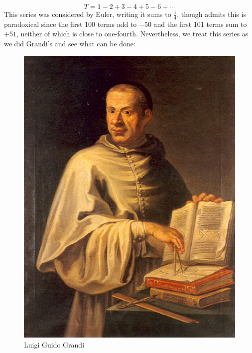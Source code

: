 \begin{example}
\begin{minipage}[c]{0.58\textwidth}
            \begin{equation}
                T=1-2+3-4+5-6+\cdots
            \end{equation}
            This series was considered by Euler, writing it sums to
            $\frac{1}{4}$, though admits this is paradoxical since the first
            100 terms add to $\minus{50}$ and the first 101 terms sum to $+51$,
            neither of which is close to one-fourth. Nevertheless, we treat this
            series as we did Grandi's and see what can be done:
        \end{minipage}
        \hfill
        \begin{minipage}[c]{0.4\textwidth}
            \centering
            \begin{figure}[H]
                \centering
                \captionsetup{type=figure}
                \if{}
                    \includegraphics{photos/GuidoGrandi.jpg}
                \fi
                \caption{Luigi Guido Grandi}
                \label{photo:GuidoGrandi}
            \end{figure}
        \end{minipage}

\end{example}
